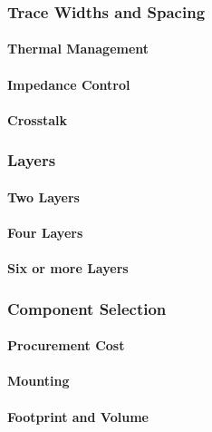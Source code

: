 \subsubsection{Trace Widths and Spacing}
\paragraph{Thermal Management}
\paragraph{Impedance Control}
\paragraph{Crosstalk}

\subsubsection{Layers}
\paragraph{Two Layers}
\paragraph{Four Layers}
\paragraph{Six or more Layers}

\subsubsection{Component Selection}
\paragraph{Procurement Cost}
\paragraph{Mounting}
\paragraph{Footprint and Volume}